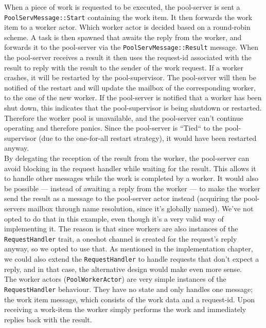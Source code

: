 \documentclass[a4paper]{article}
\begin{document}
\noindent
When a piece of work is requested to be executed, the pool-server is sent a
\texttt{PoolServMessage::Start} containing the work item. It then forwards the
work item to a worker actor. Which worker actor is decided based on a
round-robin scheme. A task is then spawned that awaits the reply from the
worker, and forwards it to the pool-server via the
\texttt{PoolServMessage::Result} message. When the pool-server receives a result
it then uses the request-id associated with the result to reply with the result
to the sender of the work request. If a worker crashes, it will be restarted by
the pool-supervisor. The pool-server will then be notified of the restart and
will update the mailbox of the corresponding worker, to the one of the new
worker. If the pool-server is notified that a worker has been shut down, this
indicates that the pool-supervisor is being shutdown or restarted. Therefore the
worker pool is unavailable, and the pool-server can't continue operating and
therefore panics. Since the pool-server is ``Tied`` to the pool-supervisor (due to
the one-for-all restart strategy), it would have been restarted anyway.\\

\noindent
By delegating the reception of the result from the worker, the pool-server can
avoid blocking in the request handler while waiting for the result. This allows
it to handle other messages while the work is completed by a worker. It would
also be possible --- instead of awaiting a reply from the worker --- to make the
worker send the result as a message to the pool-server actor instead (acquiring
the pool-servers mailbox through name resolution, since it's globally named).
We've not opted to do that in this example, even though it's a very valid way of
implementing it. The reason is that since workers are also instances of the
\texttt{RequestHandler} trait, a oneshot channel is created for the request's
reply anyway, so we opted to use that. As mentioned in the implementation
chapter, we could also extend the \texttt{RequestHandler} to handle requests
that don't expect a reply, and in that case, the alternative design would make
even more sense.\\

\noindent
The worker actors (\texttt{PoolWorkerActor}) are very simple instances of the
\texttt{RequestHandler} behaviour. They have no state and only handles one
message; the work item message, which consists of the work data and a
request-id. Upon receiving a work-item the worker simply performs the work and
immediately replies back with the result.\\
\end{document}
